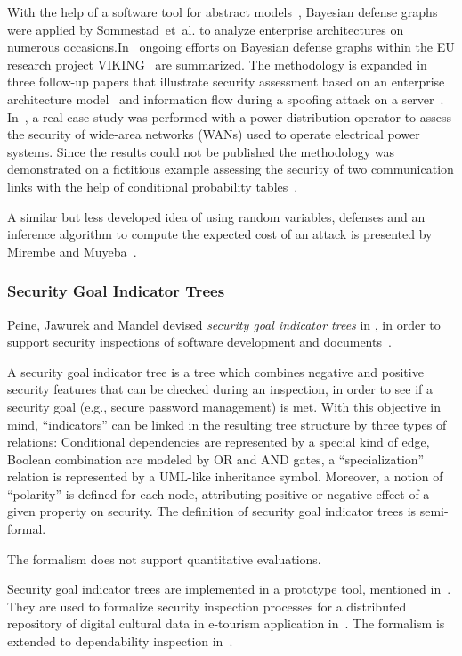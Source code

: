 \documentclass[a4paper]{article}
\begin{document}
With the help of a software tool for abstract models~\cite{JoJoSoUl}, Bayesian
defense graphs were applied by Sommestad~et~al. to analyze enterprise
architectures on numerous occasions.In~\cite{EkSo} ongoing efforts on Bayesian
defense graphs within the EU research project VIKING~\cite{Website_VIKING} are
summarized. The methodology is expanded in three follow-up papers that
illustrate security assessment based on an enterprise architecture
model~\cite{SoEkJo4,SoEkJo2} and information flow during a spoofing attack on a
server~\cite{FrSoEkJo}. In~\cite{SoEkNo}, a real case study was performed with a
power distribution operator to assess the security of wide-area networks (WANs)
used to operate electrical power systems. Since the results could not be
published the methodology was demonstrated on a fictitious example assessing the
security of two communication links with the help of conditional probability
tables~\cite{SoEkNo}.

A similar but less developed idea of using random variables, defenses and an
inference algorithm to compute the expected cost of an attack is presented by
Mirembe and Muyeba~\cite{MiMu}. 

\subsubsection{Security Goal Indicator Trees} 
\label{sec:security_goal_indicator_trees}

Peine, Jawurek and Mandel devised \emph{security goal indicator trees} in
, in order to support security inspections of software development and
documents~\cite{PeJaMa}.

A security goal indicator tree is a tree which combines negative and positive
security features that can be checked during an inspection, in order to see if a
security goal (e.g., secure password management) is met. With this objective in
mind, ``indicators'' can be linked in the resulting tree structure by three
types of relations: Conditional dependencies are represented by a special kind
of edge, Boolean combination are modeled by OR and AND gates, a
``specialization'' relation is represented by a UML-like inheritance symbol.
Moreover, a notion of ``polarity'' is defined for each node, attributing
positive or negative effect of a given property on security. The definition of
security goal indicator trees is semi-formal.

The formalism does not support quantitative evaluations.

Security goal indicator trees are implemented in a prototype tool, mentioned
in~\cite{PeJaMa}. They are used to formalize security inspection processes for
a distributed repository of digital cultural data in e-tourism application
in~\cite{JuElBaRa}. The formalism is extended to dependability inspection
in~\cite{KlElEs}.
\end{document}
